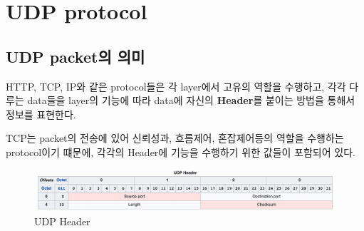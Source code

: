 \section{UDP protocol}

\subsection{UDP packet의 의미}
    HTTP, TCP, IP와 같은 protocol들은 각 layer에서 고유의 역할을 수행하고, 각각 다루는 data들을 layer의 기능에 따라 data에 자신의 \textbf{Header}를 붙이는 방법을 통해서 정보를 표현한다. 
    
    TCP는 packet의 전송에 있어 신뢰성과, 흐름제어, 혼잡제어등의 역할을 수행하는 protocol이기 떄문에, 각각의 Header에 기능을 수행하기 위한 값들이 포함되어 있다. \\
    \vspace{-4mm}  
        \begin{figure}[!h]\centering
    		\includegraphics[width=.9\textwidth]{image/week01/2-1.png}
    		\caption{\small UDP Header}
    		\vspace{-10pt}
        \end{figure}